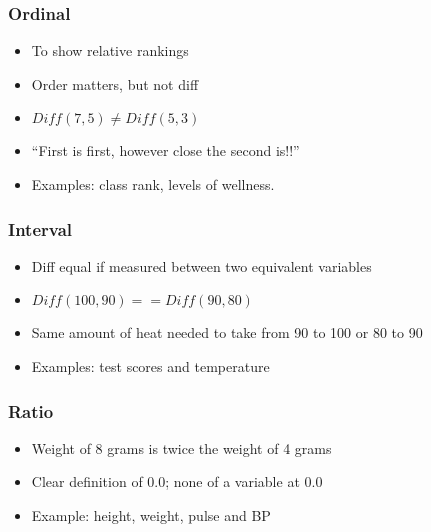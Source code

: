 \begin{frame}[fragile]\frametitle{Ordinal}	

	\begin{itemize}
	\item To show relative rankings 
	\item Order matters, but not diff
	\item $Diff(7,5) \neq Diff(5,3)$
	\item ``First is first, however close the second is!!''
	\item Examples: class rank, levels of wellness.

	\end{itemize}

\end{frame}


\begin{frame}[fragile]\frametitle{Interval}	

	\begin{itemize}
	\item Diff equal if measured between two equivalent variables
	\item $Diff(100,90) == Diff(90,80)$
	\item Same amount of heat needed to take from 90 to 100 or 80 to 90
	\item Examples: test scores and temperature
	\end{itemize}

\end{frame}


\begin{frame}[fragile]\frametitle{Ratio}	

	\begin{itemize}

	\item Weight of 8 grams is twice the weight of 4 grams
		\item Clear definition of 0.0; none of a variable at 0.0 %
	\item Example: height, weight, pulse and BP
	\end{itemize}	

\end{frame}


